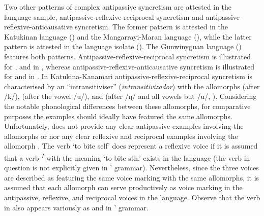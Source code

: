 Two other patterns of complex antipassive syncretism are attested in the language sample, anti\-pas\-sive-re\-flex\-ive-re\-ci\-pro\-cal syncretism and anti\-pas\-sive-re\-flex\-ive-anti\-cau\-sa\-tive syncretism. The former pattern is attested in the Katukinan language  () and the Mangarrayi-Maran language  (), while the latter pattern is attested in the language isolate  (). The Gunwinyguan language  () features both patterns. Anti\-pas\-sive-reflexive-reciprocal syncretism is illustrated for ,  and  in , whereas antipassive-reflexive-anticausative syncretism is illustrated for  and  in . In Katukina-Kanamari antipassive-reflexive-reciprocal syncretism is characterised by an “intransitiviser” (\textit{intransitivizador}) with the allomorphs  (after /k/),  (after the vowel /u/), and  (after /ŋ/ and all vowels but /u/, \citealt[121ff.]{dos-anjos:2011}). Considering the notable phonological differences between these allomorphs, for comparative purposes the examples should ideally have featured the same allomorphs. Unfortunately, \citeauthor{dos-anjos:2011} does not provide any clear antipassive examples involving the allomorphs  or  nor any clear reflexive and reciprocal examples involving the allomorph . The verb  ‘to bite self’ \citep[122]{dos-anjos:2011} does represent a reflexive voice if it is assumed that a verb \textsuperscript{?} with the meaning ‘to bite sth.’ exists in the language (the verb in question is not explicitly given in \citeauthor{dos-anjos:2011}’ grammar). Nevertheless, since the three voices are described as featuring the same voice marking with the same allomorphs, it is assumed that each allomorph can serve productively as voice marking in the antipassive, reflexive, and reciprocal voices in the language. Observe that the verb  in  also appears variously as  and  in \citeauthor{dos-anjos:2011}’ grammar.

